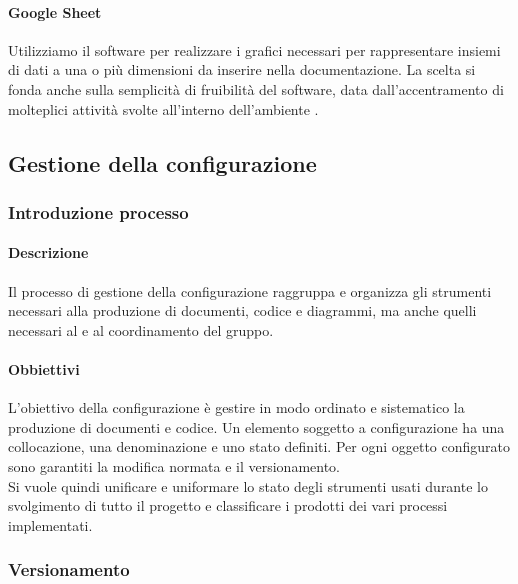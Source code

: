             \paragraph{Google Sheet}
                Utilizziamo il software  per realizzare i grafici necessari per rappresentare insiemi di dati a una o più dimensioni da inserire nella documentazione. La scelta si fonda anche sulla semplicità di fruibilità del software, data dall’accentramento di molteplici attività svolte all’interno dell’ambiente .

    \subsection{Gestione della configurazione}
        \subsubsection{Introduzione processo}
            \paragraph{Descrizione}
                Il processo di gestione della configurazione raggruppa e organizza gli strumenti necessari alla produzione di documenti, codice e diagrammi, ma anche quelli necessari al  e al coordinamento del gruppo.
            \paragraph{Obbiettivi}
                L’obiettivo della configurazione è gestire in modo ordinato e sistematico la produzione di documenti e codice. Un elemento soggetto a configurazione ha una collocazione, una denominazione e uno stato definiti. Per ogni oggetto configurato sono garantiti la modifica normata e il versionamento. \\
                Si vuole quindi unificare e uniformare lo stato degli strumenti usati durante lo svolgimento di tutto il progetto e classificare i prodotti dei vari processi implementati.
        \subsubsection{Versionamento}
